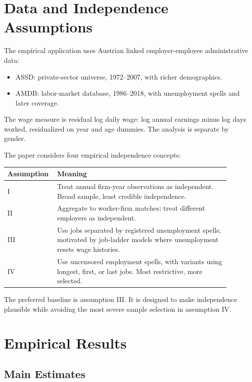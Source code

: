 \documentclass[11pt]{article}
\begin{document}
\section{Data and Independence Assumptions}

The empirical application uses Austrian linked employer-employee administrative data:
\begin{itemize}[leftmargin=*]
  \item ASSD: private-sector universe, 1972--2007, with richer demographics.
  \item AMDB: labor-market database, 1986--2018, with unemployment spells and later coverage.
\end{itemize}

The wage measure is residual log daily wage: log annual earnings minus log days worked, residualized on year and age dummies. The analysis is separate by gender.

The paper considers four empirical independence concepts:
\begin{center}
\begin{tabular}{>{\raggedright\arraybackslash}p{0.16\linewidth}p{0.74\linewidth}}
\toprule
Assumption & Meaning \\
\midrule
I & Treat annual firm-year observations as independent. Broad sample, least credible independence. \\
II & Aggregate to worker-firm matches; treat different employers as independent. \\
III & Use jobs separated by registered unemployment spells; motivated by job-ladder models where unemployment resets wage histories. \\
IV & Use uncensored employment spells, with variants using longest, first, or last jobs. Most restrictive, more selected. \\
\bottomrule
\end{tabular}
\end{center}

The preferred baseline is assumption III. It is designed to make independence plausible while avoiding the most severe sample selection in assumption IV.

\section{Empirical Results}

\subsection{Main Estimates}
\end{document}
